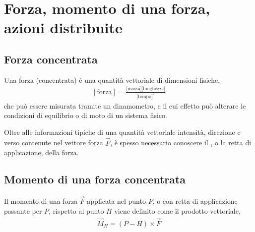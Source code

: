 \documentclass[letterpaper,10pt,italian]{jupyterBook}
\begin{document}
\section{Forza, momento di una forza, azioni distribuite}
\label{\detokenize{ch/mechanics/actions-types:forza-momento-di-una-forza-azioni-distribuite}}\label{\detokenize{ch/mechanics/actions-types:physics-hs-mechanics-actions-def}}\label{\detokenize{ch/mechanics/actions-types::doc}}

\subsection{Forza concentrata}
\label{\detokenize{ch/mechanics/actions-types:forza-concentrata}}
\sphinxAtStartPar
Una forza (concentrata) è una quantità vettoriale di dimensioni fisiche,
\begin{equation*}
\begin{split}[\text{forza}] = \frac{\text{[massa]}\text{[lunghezza]}}{\text{[tempo]}^2}\end{split}
\end{equation*}
\sphinxAtStartPar
che può essere misurata tramite un dinamometro, e il cui effetto può alterare le condizioni di equilibrio o di moto di un sistema fisico.

\sphinxAtStartPar
Oltre alle informazioni tipiche di una quantità vettoriale \sphinxhyphen{} intensità, direzione e verso \sphinxhyphen{} contenute nel vettore forza \(\vec{F}\), è spesso necessario conoscere il , o la retta di applicazione, della forza.


\subsection{Momento di una forza concentrata}
\label{\detokenize{ch/mechanics/actions-types:momento-di-una-forza-concentrata}}
\sphinxAtStartPar
Il momento di una forza \(\vec{F}\) applicata nel punto \(P\), o con retta di applicazione passante per \(P\), rispetto al punto \(H\) viene definito come il prodotto vettoriale,
\begin{equation*}
\begin{split}\vec{M}_H = (P - H) \times \vec{F}\end{split}
\end{equation*}
\end{document}

